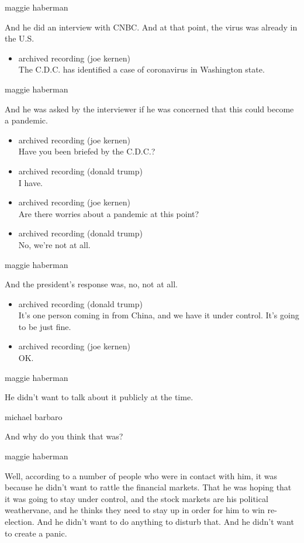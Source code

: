 maggie haberman

And he did an interview with CNBC. And at that point, the virus was
already in the U.S.

\begin{itemize}
\tightlist
\item
  archived recording (joe kernen)\\
  The C.D.C. has identified a case of coronavirus in Washington state.
\end{itemize}

maggie haberman

And he was asked by the interviewer if he was concerned that this could
become a pandemic.

\begin{itemize}
\item
  archived recording (joe kernen)\\
  Have you been briefed by the C.D.C.?
\item
  archived recording (donald trump)\\
  I have.
\item
  archived recording (joe kernen)\\
  Are there worries about a pandemic at this point?
\item
  archived recording (donald trump)\\
  No, we're not at all.
\end{itemize}

maggie haberman

And the president's response was, no, not at all.

\begin{itemize}
\item
  archived recording (donald trump)\\
  It's one person coming in from China, and we have it under control.
  It's going to be just fine.
\item
  archived recording (joe kernen)\\
  OK.
\end{itemize}

maggie haberman

He didn't want to talk about it publicly at the time.

michael barbaro

And why do you think that was?

maggie haberman

Well, according to a number of people who were in contact with him, it
was because he didn't want to rattle the financial markets. That he was
hoping that it was going to stay under control, and the stock markets
are his political weathervane, and he thinks they need to stay up in
order for him to win re-election. And he didn't want to do anything to
disturb that. And he didn't want to create a panic.

